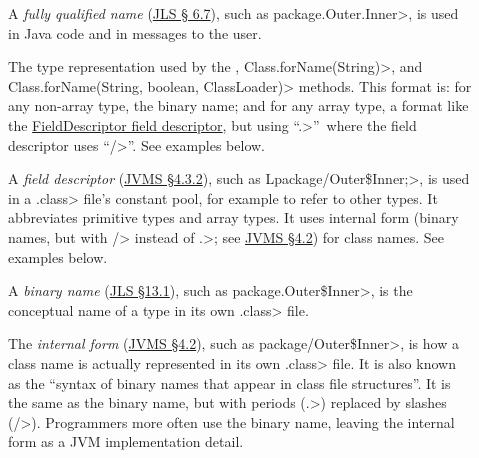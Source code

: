 \begin{description}

\item[]
  A \emph{fully qualified name} (\href{https://docs.oracle.com/javase/specs/jls/se10/html/jls-6.html#jls-6.7}{JLS \S
    6.7}), such as
  \<package.Outer.Inner>, is used in Java code and in messages to
  the user.

\item[]
\begin{sloppypar}
  The type representation used by the
  , \<Class.forName(String)>,
  and \<Class.forName(String, boolean, ClassLoader)> methods.  This format
  is:  for any non-array type, the binary name; and for any array type, a
  format like the
  \href{https://docs.oracle.com/javase/specs/jvms/se10/html/jvms-4.html#jvms-4.3.2}{FieldDescriptor
    field descriptor}, but using
  ``\<.>''~where the field descriptor uses ``\</>''.  See examples below.
\end{sloppypar}

\item[]
  A \emph{field descriptor} (\href{https://docs.oracle.com/javase/specs/jvms/se10/html/jvms-4.html#jvms-4.3.2}{JVMS \S 4.3.2}), such as
  \<Lpackage/Outer\$Inner;>, is used in a \<.class> file's constant pool,
  for example to refer to other types.  It abbreviates primitive types and
  array types.  It uses internal form (binary names, but with \</> instead of
  \<.>; see
  \href{https://docs.oracle.com/javase/specs/jvms/se10/html/jvms-4.html#jvms-4.2.1}{JVMS
    \S 4.2}) for class names.  See examples below.

\item[]
  A \emph{binary name} (\href{https://docs.oracle.com/javase/specs/jls/se10/html/jls-13.html#jls-13.1}{JLS \S 13.1}), such as
  \<package.Outer\$Inner>, is
  the conceptual name of a type in its own \<.class> file.

\item[]
  The \emph{internal form}
  (\href{https://docs.oracle.com/javase/specs/jvms/se10/html/jvms-4.html#jvms-4.2}{JVMS
    \S 4.2}), such as \<package/Outer\$Inner>, is how a class name is
  actually represented in its own \<.class> file.  It is also known as the
  ``syntax of binary names that appear in class file structures''.  It is
  the same as the binary name, but with periods (\<.>) replaced by slashes
  (\</>).  Programmers more often use the binary name, leaving the internal
  form as a JVM implementation detail.


\end{description}
